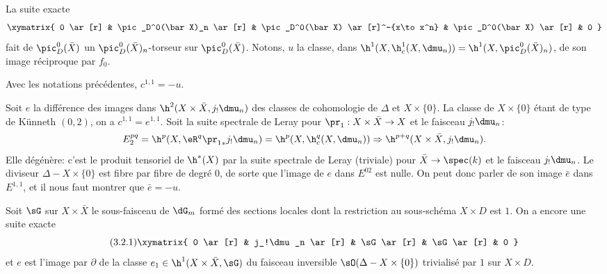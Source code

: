 La suite exacte 
\[\xymatrix{
  0 \ar[r] 
    & \pic_D^0(\bar X)_n \ar[r] 
    & \pic_D^0(\bar X) \ar[r]^-{x\to x^n} 
    & \pic_D^0(\bar X) \ar[r] 
    & 0 
}\]
fait de $\pic_D^0(\bar X)$ un $\pic_D^0(\bar X)_n$-torseur sur 
$\pic_D^0(\bar X)$. Notons, $u$ la classe, dans 
$\h^1(X,\h_c^1(X,\dmu_n))=\h^1(X,\pic_D^0(\bar X)_n)$, de son image 
réciproque par $f_0$. 





\begin{proposition_}\label{V:3-2}
Avec les notations précédentes, $c^{1,1}=-u$.
\end{proposition_}

Soit $e$ la différence des images dans $\h^2(X\times \bar X,j_!\dmu_n)$ des 
classes de cohomologie de $\Delta$ et $X\times\{0\}$. La classe de $X\times\{0\}$ étant de type de 
K\"unneth $(0,2)$, on a $c^{1,1}=e^{1,1}$. Soit la suite spectrale de Leray 
pour $\pr_1:X\times \bar X\to X$ et le faisceau $j_!\dmu_n$: 
\[
  E_2^{pq} = \h^p(X,\eR^q {\pr_1}_\ast j_!\dmu_n) = \h^p(X,\h_c^q(X,\dmu_n)) \Rightarrow \h^{p+q}(X\times \bar X,j_!\dmu_n) \text{.}
\]
Elle dégénère: c'est le produit tensoriel de $\h^*(X)$ par la 
suite spectrale de Leray (triviale) pour $\bar X\to \spec(k)$ et le faisceau 
$j_!\dmu_n$. Le diviseur $\Delta-X\times\{0\}$ est fibre par fibre de degré 
$0$, de sorte que l'image de $e$ dans $E^{02}$ est nulle. On peut donc parler 
de son image $\bar e$ dans $E^{1,1}$, et il nous faut montrer que 
$\bar e = -u$. 

Soit $\sG$ sur $X\times\bar X$ le sous-faisceau de $\dG_m$ formé des sections 
locales dont la restriction au sous-schéma $X\times D$ est $1$. On a encore 
une suite exacte 
\begin{equation*}\tag{3.2.1}\label{V:eq:3-2-1}
\xymatrix{
  0 \ar[r] 
    & j_!\dmu_n \ar[r] 
    & \sG \ar[r] 
    & \sG \ar[r] 
    & 0 
}
\end{equation*}
et $e$ est l'image par $\partial$ de la classe $e_1\in \h^1(X\times\bar X,\sG)$ 
du faisceau inversible $\sO(\Delta-X\times\{0\})$ trivialisé par $1$ sur 
$X\times D$. 

